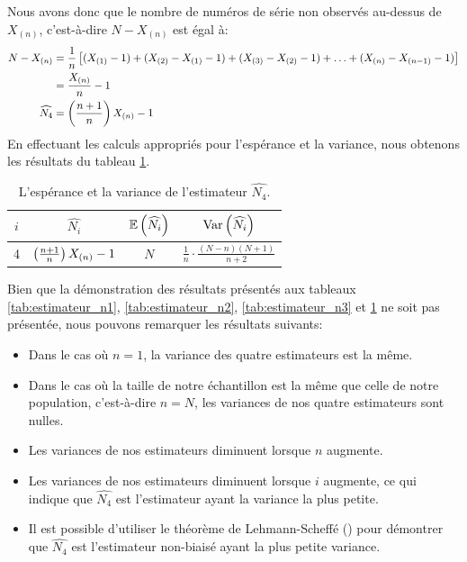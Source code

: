 \documentclass[10pt]{article}
\begin{document}
Nous avons donc que le nombre de numéros de série non observés au-dessus
de \(X_{(n)}\), c'est-à-dire \(N-X_{(n)}\) est égal à: \begin{align*}
N-X_{(n)} &= \frac{1}{n}\left[ (X_{(1)}-1)+(X_{(2)}-X_{(1)}-1)+(X_{(3)}-X_{(2)}-1)+\ldots+(X_{(n)}-X_{(n-1)}-1) \right] \\
&= \frac{X_{(n)}}{n}-1 \\
\widehat{N_4} &= \left(\frac{n+1}{n}\right) X_{(n)}-1
\end{align*} En effectuant les calculs appropriés pour l'espérance et la
variance, nous obtenons les résultats du tableau
\ref{tab:estimateur_n4}.

\begin{table}[ht]
\begin{center}
\begin{tabular}{cccc}
\toprule
$i$ & $\widehat{N_i}$ & $\operatorname{\mathbb{E}}\left(\widehat{N_i}\right)$ & $\operatorname{Var}\left(\widehat{N_i}\right)$ \\
\midrule
4 & $\left(\frac{n+1}{n}\right) X_{(n)}-1$ & $N$ & $\frac{1}{n}\cdot\frac{(N-n)(N+1)}{n+2}$ \\
\bottomrule
\end{tabular}
\end{center}
\caption{\label{tab:estimateur_n4} {L'espérance et la variance de l'estimateur $\widehat{N_4}$.} }
\end{table}

Bien que la démonstration des résultats présentés aux tableaux
\ref{tab:estimateur_n1}, \ref{tab:estimateur_n2},
\ref{tab:estimateur_n3} et \ref{tab:estimateur_n4} ne soit pas
présentée, nous pouvons remarquer les résultats suivants:

\begin{itemize}
\item
  Dans le cas où \(n=1\), la variance des quatre estimateurs est la
  même.
\item
  Dans le cas où la taille de notre échantillon est la même que celle de
  notre population, c'est-à-dire \(n=N\), les variances de nos quatre
  estimateurs sont nulles.
\item
  Les variances de nos estimateurs diminuent lorsque \(n\) augmente.
\item
  Les variances de nos estimateurs diminuent lorsque \(i\) augmente, ce
  qui indique que \(\widehat{N_4}\) est l'estimateur ayant la variance
  la plus petite.
\item
  Il est possible d'utiliser le théorème de Lehmann-Scheffé
  (\cite{WikiLehmann}) pour démontrer que \(\widehat{N_4}\) est
  l'estimateur non-biaisé ayant la plus petite variance.
\end{itemize}
\end{document}
